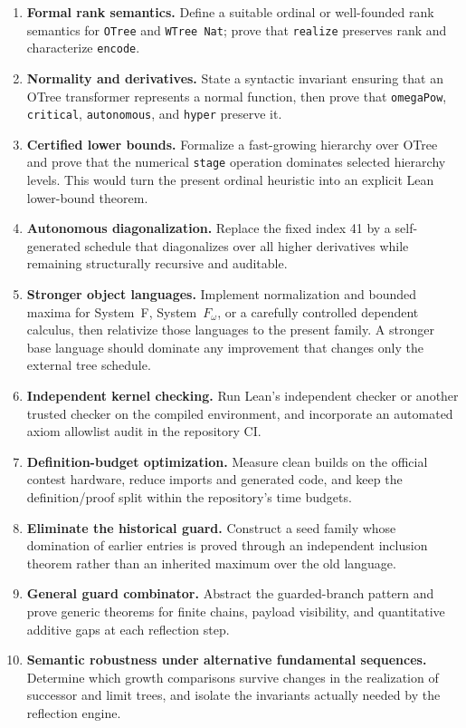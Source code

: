 \documentclass[11pt]{article}
\theoremstyle{definition}
\theoremstyle{remark}
\newcommand{\lean}[1]{\texttt{#1}}
\begin{document}
\begin{enumerate}[leftmargin=*]
\item \textbf{Formal rank semantics.}  Define a suitable ordinal or well-founded
  rank semantics for \lean{OTree} and \lean{WTree Nat}; prove that
  \lean{realize} preserves rank and characterize \lean{encode}.
\item \textbf{Normality and derivatives.}  State a syntactic invariant ensuring
  that an OTree transformer represents a normal function, then prove that
  \lean{omegaPow}, \lean{critical}, \lean{autonomous}, and \lean{hyper}
  preserve it.
\item \textbf{Certified lower bounds.}  Formalize a fast-growing hierarchy over
  OTree and prove that the numerical \lean{stage} operation dominates selected
  hierarchy levels.  This would turn the present ordinal heuristic into an
  explicit Lean lower-bound theorem.
\item \textbf{Autonomous diagonalization.}  Replace the fixed index 41 by a
  self-generated schedule that diagonalizes over all higher derivatives while
  remaining structurally recursive and auditable.
\item \textbf{Stronger object languages.}  Implement normalization and bounded
  maxima for System~F, System~$F_\omega$, or a carefully controlled dependent
  calculus, then relativize those languages to the present family.  A stronger
  base language should dominate any improvement that changes only the external
  tree schedule.
\item \textbf{Independent kernel checking.}  Run Lean's independent checker or
  another trusted checker on the compiled environment, and incorporate an
  automated axiom allowlist audit in the repository CI.
\item \textbf{Definition-budget optimization.}  Measure clean builds on the
  official contest hardware, reduce imports and generated code, and keep the
  definition/proof split within the repository's time budgets.
\item \textbf{Eliminate the historical guard.}  Construct a seed family whose
  domination of earlier entries is proved through an independent inclusion
  theorem rather than an inherited maximum over the old language.
\item \textbf{General guard combinator.}  Abstract the guarded-branch pattern and
  prove generic theorems for finite chains, payload visibility, and quantitative
  additive gaps at each reflection step.
\item \textbf{Semantic robustness under alternative fundamental sequences.}
  Determine which growth comparisons survive changes in the realization of
  successor and limit trees, and isolate the invariants actually needed by the
  reflection engine.
\end{enumerate}
\end{document}
